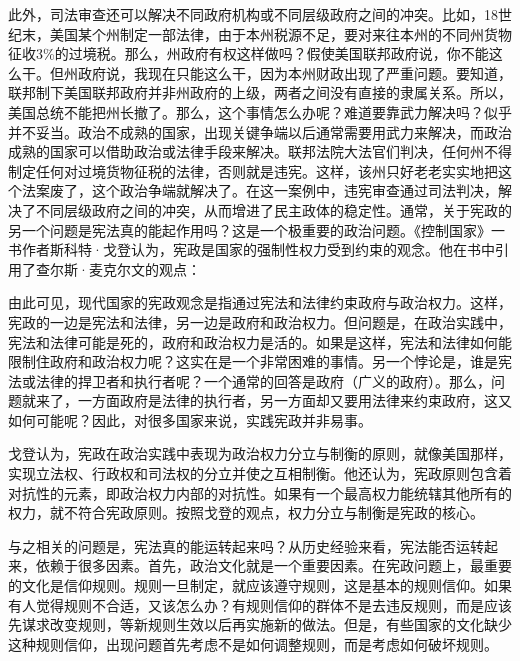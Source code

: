 此外，司法审查还可以解决不同政府机构或不同层级政府之间的冲突。比如，18世纪末，美国某个州制定一部法律，由于本州税源不足，要对来往本州的不同州货物征收3\%的过境税。那么，州政府有权这样做吗？假使美国联邦政府说，你不能这么干。但州政府说，我现在只能这么干，因为本州财政出现了严重问题。要知道，联邦制下美国联邦政府并非州政府的上级，两者之间没有直接的隶属关系。所以，美国总统不能把州长撤了。那么，这个事情怎么办呢？难道要靠武力解决吗？似乎并不妥当。政治不成熟的国家，出现关键争端以后通常需要用武力来解决，而政治成熟的国家可以借助政治或法律手段来解决。联邦法院大法官们判决，任何州不得制定任何对过境货物征税的法律，否则就是违宪。这样，该州只好老老实实地把这个法案废了，这个政治争端就解决了。在这一案例中，违宪审查通过司法判决，解决了不同层级政府之间的冲突，从而增进了民主政体的稳定性。通常，关于宪政的另一个问题是宪法真的能起作用吗？这是一个极重要的政治问题。《控制国家》一书作者斯科特·戈登认为，宪政是国家的强制性权力受到约束的观念。他在书中引用了查尔斯·麦克尔文的观点：


由此可见，现代国家的宪政观念是指通过宪法和法律约束政府与政治权力。这样，宪政的一边是宪法和法律，另一边是政府和政治权力。但问题是，在政治实践中，宪法和法律可能是死的，政府和政治权力是活的。如果是这样，宪法和法律如何能限制住政府和政治权力呢？这实在是一个非常困难的事情。另一个悖论是，谁是宪法或法律的捍卫者和执行者呢？一个通常的回答是政府（广义的政府）。那么，问题就来了，一方面政府是法律的执行者，另一方面却又要用法律来约束政府，这又如何可能呢？因此，对很多国家来说，实践宪政并非易事。

戈登认为，宪政在政治实践中表现为政治权力分立与制衡的原则，就像美国那样，实现立法权、行政权和司法权的分立并使之互相制衡。他还认为，宪政原则包含着对抗性的元素，即政治权力内部的对抗性。如果有一个最高权力能统辖其他所有的权力，就不符合宪政原则。按照戈登的观点，权力分立与制衡是宪政的核心。

与之相关的问题是，宪法真的能运转起来吗？从历史经验来看，宪法能否运转起来，依赖于很多因素。首先，政治文化就是一个重要因素。在宪政问题上，最重要的文化是信仰规则。规则一旦制定，就应该遵守规则，这是基本的规则信仰。如果有人觉得规则不合适，又该怎么办？有规则信仰的群体不是去违反规则，而是应该先谋求改变规则，等新规则生效以后再实施新的做法。但是，有些国家的文化缺少这种规则信仰，出现问题首先考虑不是如何调整规则，而是考虑如何破坏规则。

